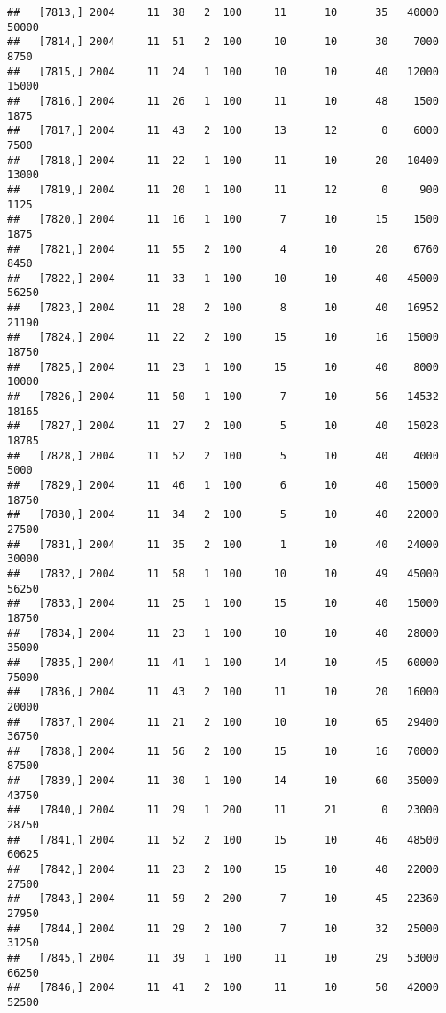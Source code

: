 \documentclass{article}\usepackage[]{graphicx}\usepackage[]{color}
\makeatletter
\newenvironment{kframe}{%
 \def\at@end@of@kframe{}%
 \ifinner\ifhmode%
  \def\at@end@of@kframe{\end{minipage}}%
  \begin{minipage}{\columnwidth}%
 \fi\fi%
 \def\FrameCommand##1{\hskip\@totalleftmargin \hskip-\fboxsep
 \colorbox{shadecolor}{##1}\hskip-\fboxsep
     \hskip-\linewidth \hskip-\@totalleftmargin \hskip\columnwidth}%
 \MakeFramed {\advance\hsize-\width
   \@totalleftmargin\z@ \linewidth\hsize
   \@setminipage}}%
 {\par\unskip\endMakeFramed%
 \at@end@of@kframe}
\newenvironment{knitrout}{}{} %
\makeatother
\begin{document}
\begin{knitrout}
\begin{kframe}
\begin{verbatim}
##   [7813,] 2004     11  38   2  100     11      10      35   40000   50000
##   [7814,] 2004     11  51   2  100     10      10      30    7000    8750
##   [7815,] 2004     11  24   1  100     10      10      40   12000   15000
##   [7816,] 2004     11  26   1  100     11      10      48    1500    1875
##   [7817,] 2004     11  43   2  100     13      12       0    6000    7500
##   [7818,] 2004     11  22   1  100     11      10      20   10400   13000
##   [7819,] 2004     11  20   1  100     11      12       0     900    1125
##   [7820,] 2004     11  16   1  100      7      10      15    1500    1875
##   [7821,] 2004     11  55   2  100      4      10      20    6760    8450
##   [7822,] 2004     11  33   1  100     10      10      40   45000   56250
##   [7823,] 2004     11  28   2  100      8      10      40   16952   21190
##   [7824,] 2004     11  22   2  100     15      10      16   15000   18750
##   [7825,] 2004     11  23   1  100     15      10      40    8000   10000
##   [7826,] 2004     11  50   1  100      7      10      56   14532   18165
##   [7827,] 2004     11  27   2  100      5      10      40   15028   18785
##   [7828,] 2004     11  52   2  100      5      10      40    4000    5000
##   [7829,] 2004     11  46   1  100      6      10      40   15000   18750
##   [7830,] 2004     11  34   2  100      5      10      40   22000   27500
##   [7831,] 2004     11  35   2  100      1      10      40   24000   30000
##   [7832,] 2004     11  58   1  100     10      10      49   45000   56250
##   [7833,] 2004     11  25   1  100     15      10      40   15000   18750
##   [7834,] 2004     11  23   1  100     10      10      40   28000   35000
##   [7835,] 2004     11  41   1  100     14      10      45   60000   75000
##   [7836,] 2004     11  43   2  100     11      10      20   16000   20000
##   [7837,] 2004     11  21   2  100     10      10      65   29400   36750
##   [7838,] 2004     11  56   2  100     15      10      16   70000   87500
##   [7839,] 2004     11  30   1  100     14      10      60   35000   43750
##   [7840,] 2004     11  29   1  200     11      21       0   23000   28750
##   [7841,] 2004     11  52   2  100     15      10      46   48500   60625
##   [7842,] 2004     11  23   2  100     15      10      40   22000   27500
##   [7843,] 2004     11  59   2  200      7      10      45   22360   27950
##   [7844,] 2004     11  29   2  100      7      10      32   25000   31250
##   [7845,] 2004     11  39   1  100     11      10      29   53000   66250
##   [7846,] 2004     11  41   2  100     11      10      50   42000   52500

\end{verbatim}
\end{kframe}
\end{knitrout}
\end{document}
